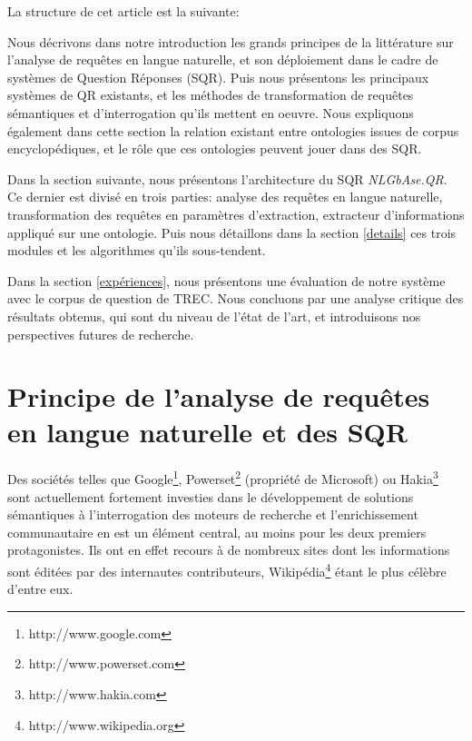 \documentclass[10pt,a4paper]{article}
\begin{document}
\par La structure de cet article est la suivante: 

\par Nous décrivons dans notre introduction les grands principes de la littérature sur l'analyse de requêtes en langue naturelle, et son déploiement dans le cadre de systèmes de Question Réponses (SQR). Puis nous présentons les principaux systèmes de QR existants, et les méthodes de transformation de requêtes sémantiques et d'interrogation qu'ils mettent en oeuvre. Nous expliquons également dans cette section la relation existant entre ontologies issues de corpus encyclopédiques, et le rôle que ces ontologies peuvent jouer dans des SQR. 
\par Dans la section suivante, nous présentons l'architecture du SQR \textit{NLGbAse.QR}. Ce dernier est divisé en trois parties: analyse des requêtes en langue naturelle, transformation des requêtes en paramètres d'extraction, extracteur d'informations appliqué sur une ontologie. Puis nous détaillons dans la section \ref{details} ces trois modules et les algorithmes qu'ils sous-tendent. 
\par Dans la section \ref{expériences}, nous présentons une évaluation de notre système avec le corpus de question de TREC. Nous concluons par une analyse critique des résultats obtenus, qui sont du niveau de l'état de l'art, et introduisons nos perspectives futures de recherche. 

\section{Principe de l'analyse de requêtes en langue naturelle et des SQR}
\par Des sociétés telles que Google\footnote{http://www.google.com}, Powerset\footnote{http://www.powerset.com} (propriété de Microsoft) ou Hakia\footnote{http://www.hakia.com} sont actuellement fortement investies dans le développement de solutions sémantiques à l'interrogation des moteurs de recherche et l'enrichissement communautaire en est un élément central, au moins pour les deux premiers protagonistes. Ils ont en effet recours à de nombreux sites dont les informations sont éditées par des internautes contributeurs, Wikipédia\footnote{http://www.wikipedia.org} étant le plus célèbre d'entre eux.
\end{document}
